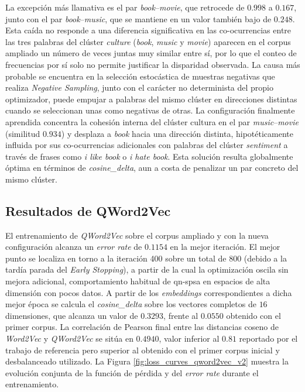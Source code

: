 La excepción más llamativa es el par \textit{book}--\textit{movie}, que retrocede de $0.998$ a $0.167$, junto con el par \textit{book}--\textit{music}, que se mantiene en un valor también bajo de $0.248$. Esta caída no responde a una diferencia significativa en las co-ocurrencias entre las tres palabras del clúster \textit{culture} (\textit{book}, \textit{music} y \textit{movie}) aparecen en el corpus ampliado un número de veces juntas muy similar entre sí, por lo que el conteo de frecuencias por sí solo no permite justificar la disparidad observada. La causa más probable se encuentra en la selección estocástica de muestras negativas que realiza \textit{Negative Sampling}, junto con el carácter no determinista del propio optimizador, puede empujar a palabras del mismo clúster en direcciones distintas cuando se seleccionan unas como negativas de otras. La configuración finalmente aprendida concentra la cohesión interna del clúster cultura en el par \textit{music}--\textit{movie} (similitud $0.934$) y desplaza a \textit{book} hacia una dirección distinta, hipotéticamente influida por sus co-ocurrencias adicionales con palabras del clúster \textit{sentiment} a través de frases como \textit{i like book} o \textit{i hate book}. Esta solución resulta globalmente óptima en términos de \textit{cosine\_delta}, aun a costa de penalizar un par concreto del mismo clúster.

\subsection{Resultados de QWord2Vec}

El entrenamiento de \textit{QWord2Vec} sobre el corpus ampliado y con la nueva configuración alcanza un \textit{error rate} de $0.1154$ en la mejor iteración. El mejor punto se localiza en torno a la iteración 400 sobre un total de 800 (debido a la tardía parada del \textit{Early Stopping}), a partir de la cual la optimización oscila sin mejora adicional, comportamiento habitual de \gls{qn-spsa} en espacios de alta dimensión con pocos datos. A partir de los \textit{embeddings} correspondientes a dicha mejor época se calcula el \textit{cosine\_delta} sobre los vectores completos de $16$ dimensiones, que alcanza un valor de $0.3293$, frente al $0.0550$ obtenido con el primer corpus. La correlación de Pearson final entre las distancias coseno de \textit{Word2Vec} y \textit{QWord2Vec} se sitúa en $0.4940$, valor inferior al $0.81$ reportado por el trabajo de referencia \cite{ohno_qword2vec_2025} pero superior al obtenido con el primer corpus inicial y desbalanceado utilizado. La Figura \ref{fig:loss_curves_qword2vec_v2} muestra la evolución conjunta de la función de pérdida y del \textit{error rate} durante el entrenamiento.

